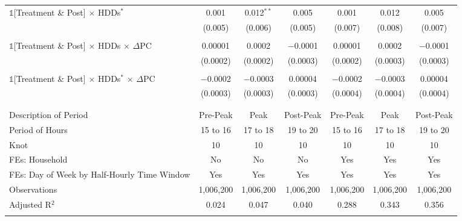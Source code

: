 \begin{table}[!htbp]
\begin{tabular}{@{\extracolsep{95pt}}lcccccc}
 $\mathbb{1}$[Treatment \& Post] $\times$ HDDs$^{*}$ & 0.001 & 0.012$^{**}$ & 0.005 & 0.001 & 0.012 & 0.005 \\ 
  & (0.005) & (0.006) & (0.005) & (0.007) & (0.008) & (0.007) \\ 
  & & & & & & \\ 
 $\mathbb{1}$[Treatment \& Post] $\times$ HDDs $\times$ $\Delta$PC & 0.00001 & 0.0002 & $-$0.0001 & 0.00001 & 0.0002 & $-$0.0001 \\ 
  & (0.0002) & (0.0002) & (0.0003) & (0.0002) & (0.0003) & (0.0003) \\ 
  & & & & & & \\ 
 $\mathbb{1}$[Treatment \& Post] $\times$ HDDs$^{*}$ $\times$ $\Delta$PC & $-$0.0002 & $-$0.0003 & 0.00004 & $-$0.0002 & $-$0.0003 & 0.00004 \\ 
  & (0.0003) & (0.0003) & (0.0003) & (0.0004) & (0.0004) & (0.0004) \\ 
  & & & & & & \\ 
\hline \\[-1.8ex] 
Description of Period & Pre-Peak & Peak & Post-Peak & Pre-Peak & Peak & Post-Peak \\ 
Period of Hours & 15 to 16 & 17 to 18 & 19 to 20 & 15 to 16 & 17 to 18 & 19 to 20 \\ 
Knot & 10 & 10 & 10 & 10 & 10 & 10 \\ 
FEs: Household & No & No & No & Yes & Yes & Yes \\ 
FEs: Day of Week by Half-Hourly Time Window & Yes & Yes & Yes & Yes & Yes & Yes \\ 
Observations & 1,006,200 & 1,006,200 & 1,006,200 & 1,006,200 & 1,006,200 & 1,006,200 \\ 
Adjusted R$^{2}$ & 0.024 & 0.047 & 0.040 & 0.288 & 0.343 & 0.356 \\ 
\hline 
\hline \\[-1.8ex] 
\end{tabular} 
\end{table} 

